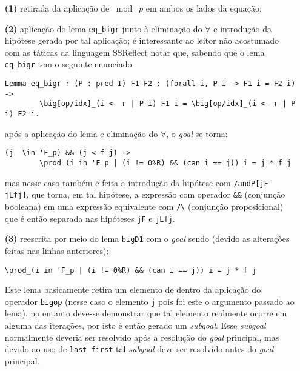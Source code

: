 \begin{enumerate}[label=\textbf{\roman*.}]
\begin{enumerate}
                \item[\textbf{(1)}] retirada da aplicação de $\bmod \; p$ em ambos os lados da equação;
                
                \item[\textbf{(2)}] aplicação do lema \lstinline[language=coq]|eq_bigr| junto à eliminação do $\forall$ e introdução da hipótese gerada por tal aplicação; é interessante ao leitor não acostumado com as táticas da linguagem SSReflect notar que, sabendo que o lema \lstinline[language=coq]|eq_bigr| tem o seguinte enunciado:
                        \begin{lstlisting}[language=coq,frame=single,tabsize=1]
Lemma eq_bigr r (P : pred I) F1 F2 : (forall i, P i -> F1 i = F2 i) ->
        \big[op/idx]_(i <- r | P i) F1 i = \big[op/idx]_(i <- r | P i) F2 i.
                        \end{lstlisting}
                após a aplicação do lema e eliminação do $\forall$, o \textit{goal} se torna:
                        \begin{lstlisting}[language=coq,frame=single,tabsize=1]
(j  \in 'F_p) && (j < f j) -> 
        \prod_(i in 'F_p | (i != 0%R) && (can i == j)) i = j * f j
                        \end{lstlisting}
                mas nesse caso também é feita a introdução da hipótese com \lstinline[language=coq]|/andP[jF jLfj]|, que torna, em tal hipótese, a expressão com operador \lstinline[language=coq]|&&| (conjunção booleana) em uma expressão equivalente com \lstinline[language=coq]|/\| (conjunção proposicional) que é então separada nas hipóteses \lstinline[language=coq]|jF| e \lstinline[language=coq]|jLfj|.

                \item[\textbf{(3)}] reescrita por meio do lema \lstinline[language=coq]|bigD1| com o \textit{goal} sendo (devido as alterações feitas nas linhas anteriores):
                        \begin{lstlisting}[language=coq,frame=single,tabsize=1]
\prod_(i in 'F_p | (i != 0%R) && (can i == j)) i = j * f j
                        \end{lstlisting}
                Este lema basicamente retira um elemento de dentro da aplicação do operador \lstinline[language=coq]|bigop| (nesse caso o elemento \lstinline[language=coq]|j| pois foi este o argumento passado ao lema), no entanto deve-se demonstrar que tal elemento realmente ocorre em alguma das iterações, por isto é então gerado um \textit{subgoal}. Esse \textit{subgoal} normalmente deveria ser resolvido após a resolução do \textit{goal} principal, mas devido ao uso de \lstinline[language=coq]|last first| tal \textit{subgoal} deve ser resolvido antes do \textit{goal} principal.
                

\end{enumerate}
\end{enumerate}

